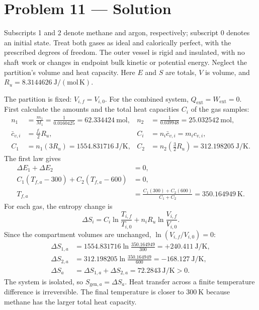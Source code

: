 \section*{Problem 11 --- Solution}
Subscripts 1 and 2 denote methane and argon, respectively; subscript 0 denotes
an initial state. Treat both gases as ideal and calorically perfect, with the
prescribed degrees of freedom. The outer vessel is rigid and insulated, with
no shaft work or changes in endpoint bulk kinetic or potential energy.
Neglect the partition's volume and heat capacity. Here $E$ and $S$ are totals,
$V$ is volume, and $R_u=8.3144626~\mathrm{J/(mol\,K)}$.

The partition is fixed: $V_{i,f}=V_{i,0}$. For the combined system,
$Q_{\mathrm{ext}}=W_{\mathrm{ext}}=0$.
First calculate the amounts and the total heat capacities $C_i$ of the gas samples:
\begin{align*}
n_1&=\frac{m_1}{M_1}=\frac{1}{0.0160425}=62.334424~\mathrm{mol},
&n_2&=\frac{1}{0.039948}=25.032542~\mathrm{mol},\\
\bar c_{v,i}&=\frac{f_i}{2}R_u,
&C_i&=n_i\bar c_{v,i}=m_ic_{v,i},\\
C_1&=n_1(3R_u)=1554.831716~\mathrm{J/K},
&C_2&=n_2\left(\frac32R_u\right)=312.198205~\mathrm{J/K}.
\end{align*}
The first law gives
\begin{align*}
\Delta E_1+\Delta E_2&=0,\\
C_1(T_{f,a}-300)+C_2(T_{f,a}-600)&=0,\\
T_{f,a}&=\frac{C_1(300)+C_2(600)}{C_1+C_2}
=\boxed{350.164949~\mathrm{K}}.
\end{align*}
For each gas, the entropy change is
\[
\Delta S_i=C_i\ln\frac{T_{i,f}}{T_{i,0}}
+n_iR_u\ln\frac{V_{i,f}}{V_{i,0}}.
\]
Since the compartment volumes are unchanged, $\ln(V_{i,f}/V_{i,0})=0$:
\begin{align*}
\Delta S_{1,a}&=1554.831716\ln\frac{350.164949}{300}
=\boxed{+240.411~\mathrm{J/K}},\\
\Delta S_{2,a}&=312.198205\ln\frac{350.164949}{600}
=\boxed{-168.127~\mathrm{J/K}},\\
\Delta S_a&=\Delta S_{1,a}+\Delta S_{2,a}
=\boxed{72.2843~\mathrm{J/K}}>0.
\end{align*}
The system is isolated, so $S_{\mathrm{gen},a}=\Delta S_a$.
Heat transfer across a finite temperature difference is irreversible.
The final temperature is closer to $300~\mathrm{K}$ because methane has the larger total heat capacity.


